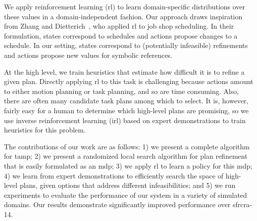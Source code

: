 We apply reinforcement learning ({\sc rl}) to learn domain-specific
distributions over these values in a domain-independent fashion.  Our
approach draws inspiration from Zhang and
Dietterich~\cite{JobShopSched}, who applied {\sc rl} to job shop
scheduling. In their formulation, states correspond to schedules and
actions propose changes to a schedule. In our setting, states
correspond to (potentially infeasible) refinements and actions propose
new values for symbolic references.


At the high level, we train heuristics that estimate how difficult it
is to refine a given plan. Directly applying {\sc rl} to
this task is challenging because actions amount to either motion
planning or task planning, and so are time consuming. Also, there are often
many candidate task plans among which to select. It is,
however, fairly easy for a human to determine which high-level plans
are promising, so we use inverse reinforcement learning ({\sc irl}) based on
expert demonstrations to train heuristics for this problem.


The contributions of our work are as follows: 1) we present a complete
algorithm for {\sc tamp}; 2) we present a randomized local search
algorithm for plan refinement that is easily formulated as an {\sc
  mdp}; 3) we apply {\sc rl} to learn a policy for this {\sc mdp}; 4)
we learn from expert demonstrations to efficiently search the space of
high-level plans, given options that address different
infeasibilities; and 5) we run experiments to evaluate the performance
of our system in a variety of simulated domains. Our results
demonstrate significantly improved performance over {\sc sfrcra-14}.
